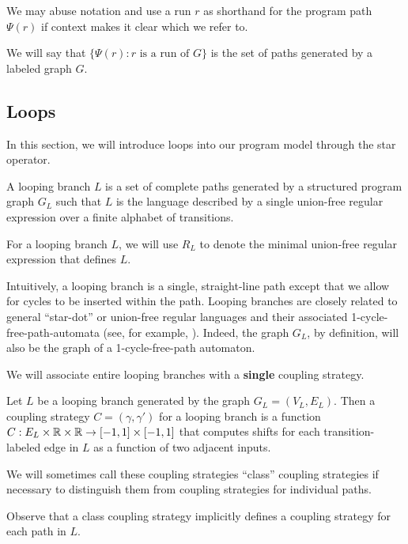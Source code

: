 We may abuse notation and use a run $r$ as shorthand for the program path $\Psi(r)$ if context makes it clear which we refer to. 

We will say that $\{\Psi(r): r\text{ is a run of }G\}$ is the set of paths generated by a labeled graph $G$. 

\subsection{Loops}

In this section, we will introduce loops into our program model through the star operator.

\begin{defn}
    A looping branch $L$ is a set of complete paths generated by a structured program graph $G_L$ such that $L$ is the language described by a single union-free regular expression over a finite alphabet of transitions. 
\end{defn}

For a looping branch $L$, we will use $R_L$ to denote the minimal union-free regular expression that defines $L$. 

Intuitively, a looping branch is a single, straight-line path except that we allow for cycles to be inserted within the path. Looping branches are closely related to general ``star-dot'' or union-free regular languages and their associated 1-cycle-free-path-automata (see, for example, \cite{nagy2006union}). Indeed, the graph $G_L$, by definition, will also be the graph of a 1-cycle-free-path automaton. 

We will associate entire looping branches with a \textbf{single} coupling strategy.

\begin{defn}
    Let $L$ be a looping branch generated by the graph $G_L = (V_L, E_L)$. Then a coupling strategy $C = (\gamma, \gamma')$ for a looping branch is a function $C:E_L\times\mathbb{R} \times\mathbb{R}\to [-1, 1]\times[-1, 1]$ that computes shifts for each transition-labeled edge in $L$ as a function of two adjacent inputs.
\end{defn}

We will sometimes call these coupling strategies ``class'' coupling strategies if necessary to distinguish them from coupling strategies for individual paths.

Observe that a class coupling strategy implicitly defines a coupling strategy for each path in $L$.


